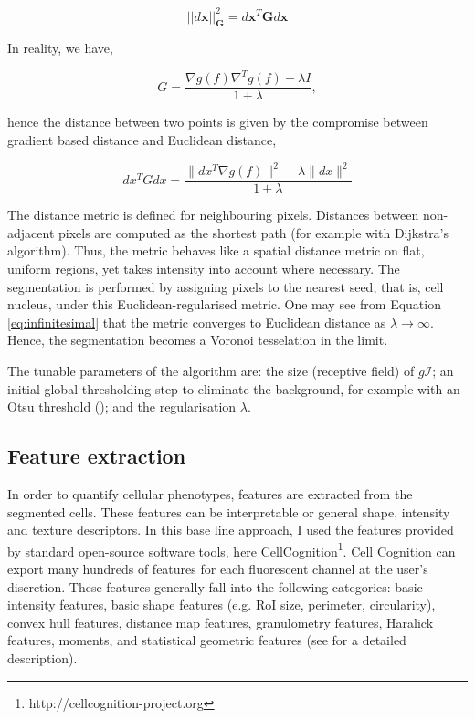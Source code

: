 \begin{equation}
||d\mathbf{x}||_{\mathbf{G}}^2 = d\mathbf{x}^T\mathbf{G}d\mathbf{x}
\label{eq:infinitesimal}
\end{equation}

In reality, we have,

\begin{equation}
G = \frac{\nabla g(f)\nabla^Tg(f) + \lambda I}{1+\lambda},
\end{equation}

hence the distance between two points is given by the compromise between gradient based distance and Euclidean distance,

\begin{equation}
dx^TGdx = \frac{\|dx^T\nabla g(f)\|^2 + \lambda\|dx\|^2}{1+\lambda}
\end{equation}

The distance metric is defined for neighbouring pixels. Distances between non-adjacent pixels are computed as the shortest path (for example with Dijkstra's algorithm). Thus, the metric behaves like a spatial distance metric on flat, uniform regions, yet takes intensity into account where necessary. The segmentation is performed by assigning pixels to the nearest seed, that is, cell nucleus, under this Euclidean-regularised metric. One may see from Equation \ref{eq:infinitesimal} that the metric converges to Euclidean distance as $\lambda \to \infty$. Hence, the segmentation becomes a Voronoi tesselation in the limit. 

The tunable parameters of the algorithm are: the size (receptive field) of $g\mathcal{I}$; an initial global thresholding step to eliminate the background, for example with an Otsu threshold (\cite{otsu1979threshold}); and the regularisation $\lambda$.

\subsection{Feature extraction}

In order to quantify cellular phenotypes, features are extracted from the segmented cells. These features can be interpretable or general shape, intensity and texture descriptors. In this base line approach, I used the features provided by standard open-source software tools, here CellCognition\footnote{http://cellcognition-project.org}. Cell Cognition can export many hundreds of features for each fluorescent channel at the user's discretion. These features generally fall into the following categories: basic intensity features, basic shape features (e.g. RoI size, perimeter, circularity), convex hull features, distance map features, granulometry features, Haralick features, moments, and statistical geometric features (see \cite{held2010cellcognition, walter2010automatic} for a detailed description). 

